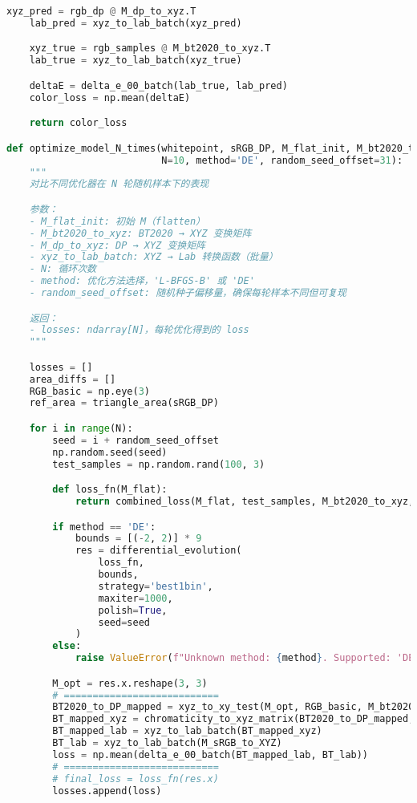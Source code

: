\begin{lstlisting}[language=Python]
    xyz_pred = rgb_dp @ M_dp_to_xyz.T
    lab_pred = xyz_to_lab_batch(xyz_pred)

    xyz_true = rgb_samples @ M_bt2020_to_xyz.T
    lab_true = xyz_to_lab_batch(xyz_true)

    deltaE = delta_e_00_batch(lab_true, lab_pred)
    color_loss = np.mean(deltaE)

    return color_loss 

def optimize_model_N_times(whitepoint, sRGB_DP, M_flat_init, M_bt2020_to_xyz, M_dp_to_xyz, xyz_to_lab_batch,
                           N=10, method='DE', random_seed_offset=31):
    """
    对比不同优化器在 N 轮随机样本下的表现

    参数：
    - M_flat_init: 初始 M（flatten）
    - M_bt2020_to_xyz: BT2020 → XYZ 变换矩阵
    - M_dp_to_xyz: DP → XYZ 变换矩阵
    - xyz_to_lab_batch: XYZ → Lab 转换函数（批量）
    - N: 循环次数
    - method: 优化方法选择，'L-BFGS-B' 或 'DE'
    - random_seed_offset: 随机种子偏移量，确保每轮样本不同但可复现

    返回：
    - losses: ndarray[N]，每轮优化得到的 loss
    """

    losses = []
    area_diffs = []
    RGB_basic = np.eye(3)
    ref_area = triangle_area(sRGB_DP)

    for i in range(N):
        seed = i + random_seed_offset
        np.random.seed(seed)
        test_samples = np.random.rand(100, 3)

        def loss_fn(M_flat):
            return combined_loss(M_flat, test_samples, M_bt2020_to_xyz, M_dp_to_xyz, xyz_to_lab_batch)

        if method == 'DE':
            bounds = [(-2, 2)] * 9
            res = differential_evolution(
                loss_fn,
                bounds,
                strategy='best1bin',
                maxiter=1000,
                polish=True,
                seed=seed
            )
        else:
            raise ValueError(f"Unknown method: {method}. Supported: 'DE'")

        M_opt = res.x.reshape(3, 3)
        # ===========================
        BT2020_to_DP_mapped = xyz_to_xy_test(M_opt, RGB_basic, M_bt2020_to_xyz)
        BT_mapped_xyz = chromaticity_to_xyz_matrix(BT2020_to_DP_mapped, whitepoint)
        BT_mapped_lab = xyz_to_lab_batch(BT_mapped_xyz)
        BT_lab = xyz_to_lab_batch(M_sRGB_to_XYZ)
        loss = np.mean(delta_e_00_batch(BT_mapped_lab, BT_lab))
        # ===========================
        # final_loss = loss_fn(res.x)
        losses.append(loss)


\end{lstlisting}
